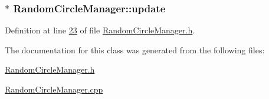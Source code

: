 \hypertarget{class_random_circle_manager_a05c52359eec88a70be1296bfbeeb17c7}{}
\subsubsection[{update}]{$\ast$ Random\+Circle\+Manager\+::update}\label{class_random_circle_manager_a05c52359eec88a70be1296bfbeeb17c7}


Definition at line \hyperlink{_random_circle_manager_8h_source_l00023}{23} of file \hyperlink{_random_circle_manager_8h_source}{Random\+Circle\+Manager.\+h}.



The documentation for this class was generated from the following files\+:\begin{DoxyCompactItemize}
\item 
\hyperlink{_random_circle_manager_8h}{Random\+Circle\+Manager.\+h}\item 
\hyperlink{_random_circle_manager_8cpp}{Random\+Circle\+Manager.\+cpp}\end{DoxyCompactItemize}
